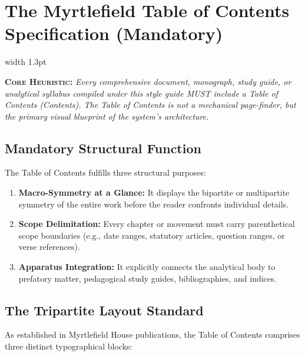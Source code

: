 \documentclass[11pt,letterpaper]{article}
\newcommand{\scholion}[2]{%
  \par\vspace{0.3em}%
  \noindent\hspace*{0.8em}%
  {\color{#1}\vrule width 1.3pt}\hspace{0.7em}%
  \parbox{\dimexpr\linewidth-2.2em}{#2}%
  \par\vspace{0.3em}%
}
\newcommand{\heuristicrule}[1]{\scholion{myrtleWine}{\small\color{myrtleDark}\textbf{\textsc{Core Heuristic:}} \itshape #1}}
\begin{document}
\section{The Myrtlefield Table of Contents Specification (Mandatory)}

\heuristicrule{Every comprehensive document, monograph, study guide, or analytical syllabus compiled under this style guide MUST include a Table of Contents (Contents). The Table of Contents is not a mechanical page-finder, but the primary visual blueprint of the system's architecture.}

\subsection{Mandatory Structural Function}
The Table of Contents fulfills three structural purposes:
\begin{enumerate}
  \item \textbf{Macro-Symmetry at a Glance:} It displays the bipartite or multipartite symmetry of the entire work before the reader confronts individual details.
  \item \textbf{Scope Delimitation:} Every chapter or movement must carry parenthetical scope boundaries (e.g., date ranges, statutory articles, question ranges, or verse references).
  \item \textbf{Apparatus Integration:} It explicitly connects the analytical body to prefatory matter, pedagogical study guides, bibliographies, and indices.
\end{enumerate}

\subsection{The Tripartite Layout Standard}
As established in Myrtlefield House publications, the Table of Contents comprises three distinct typographical blocks:
\end{document}
